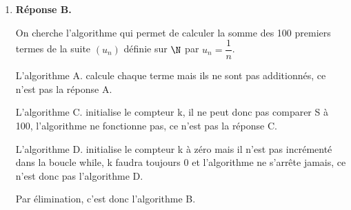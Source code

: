 \begin{enumerate}
On cherche la probabilité $P_V(B)$.

$P(\mathrm{V} \cap B) = P(B) \times P_ B(V)=\dfrac{1}{2}\times \dfrac{3}{4}=\dfrac{3}{8}$

Les évènements $A$ et $B$ partitionnant l'univers,  la loi des probabilités totales donne :

$P(V)=P(V\cap A )+p(V \cap B) =P(A) \times P_A(V) +\dfrac{3}{8}=\dfrac{1}{2}\times \dfrac{1}{2}+\dfrac{3}{8}=\dfrac{1}{4}+\dfrac{3}{8}= \dfrac{2}{8}+\dfrac{3}{8}=\dfrac{5}{8}$

$P_V(B)=\dfrac{P(V\cap B)}{P(V)}= \dfrac{\frac{3}{8}}{\frac{5}{8}}= \dfrac{3}{5}$.
\item \textbf{Réponse B.}

%
%

On cherche l'algorithme qui permet de calculer la somme des 100 premiers termes de la suite $\left( u_n\right)$ définie sur $\N$ par $u_n=\dfrac{1}{n}$.
	
	L'algorithme A.  calcule chaque terme mais ils ne sont pas additionnés,  ce n'est pas la réponse A. 
	
	L'algorithme C.  initialise le compteur k,  il ne peut donc pas comparer S à 100,  l'algorithme ne fonctionne pas,  ce n'est pas la réponse C.

	L'algorithme D. initialise le compteur k à zéro mais il n'est pas incrémenté dans la boucle while,  k faudra toujours 0 et l'algorithme ne s'arrête jamais, ce n'est donc pas l'algorithme D. 

	Par élimination,  c'est donc l'algorithme B. 

\end{enumerate}
\bigskip

